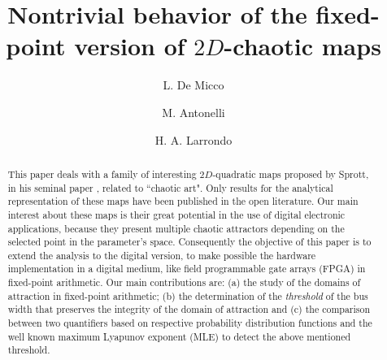 \documentclass[manuscript, review, screen]{acmart}
\begin{document}
\title{Nontrivial behavior of the fixed-point version of $2D$-chaotic maps} 
\author{L. De Micco}

\author{M. Antonelli}
\author{H. A. Larrondo}
%  

\begin{abstract}
This paper deals with a family of interesting $2D$-quadratic maps
 proposed by Sprott, in his seminal paper \cite{Sprott1993},
related to ``chaotic art".  Only results for the analytical representation of these
maps have been published in the open literature. Our main interest about these maps is their great potential in the use of digital electronic applications, because
they present multiple chaotic attractors depending on the selected
point in the parameter's space. Consequently the objective of
this paper is to extend the analysis to the digital version, to make
possible  the hardware implementation in a digital medium, like field programmable gate arrays (FPGA) in fixed-point arithmetic.
Our main contributions are: (a) the study of the domains of attraction in fixed-point arithmetic; (b)  the determination of the \textsl{threshold} of the bus width that preserves the integrity of the domain of
attraction and (c) the comparison between two quantifiers based on respective probability distribution functions and  the well known maximum Lyapunov exponent (MLE) to detect the above mentioned threshold. 
\end{abstract}





%
\end{document}
